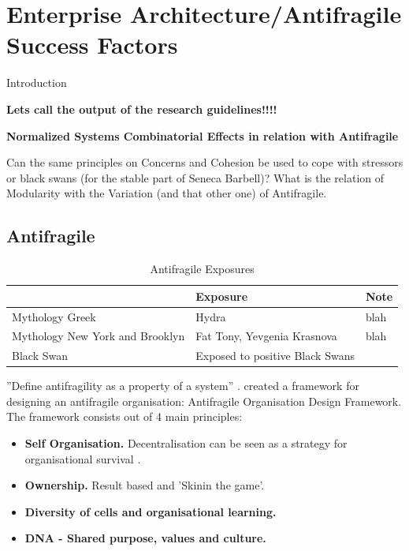 \chapter{Enterprise Architecture/Antifragile Success Factors}
\label{ch:eaafsuccessfactors}

Introduction

\begin{remark}
\textbf{Lets call the output of the research guidelines!!!!}
\end{remark}

\begin{remark}
\textbf{Normalized Systems Combinatorial Effects in relation with Antifragile}

Can the same principles on Concerns and Cohesion be used to cope with stressors or black swans (for the stable part of Seneca Barbell)? What is the relation of Modularity with the Variation (and that other one) of Antifragile.
\end{remark}



\section{Antifragile}
\label{sec:sfantifragile}

\parencite[p. 23-27]{Taleb2012}
\begin{longtable}{p{}p{}p{}}
	& \textbf{Exposure} & \textbf{Note} \\ \midrule%
	\endhead%
	\hline
	\caption{Antifragile Exposures}
	\label{tab:sfantifragile types of exposure}	
	\endfoot%
	Mythology Greek & Hydra & blah \\
	Mythology New York and Brooklyn & Fat Tony, Yevgenia Krasnova & blah \\
	Black Swan & Exposed to positive Black Swans & \\
	
	\bottomrule
\end{longtable}

''Define antifragility as a property of a system'' \parencite{Jaaron2014}. \textcite{Kastner2017} created a framework for designing an antifragile organisation: Antifragile Organisation Design Framework. The framework consists out of 4 main principles:
\begin{itemize}
	\item{\textbf{Self Organisation.} Decentralisation can be seen as a strategy for organisational survival \parencite{Brafman2007}.}
	\item{\textbf{Ownership.} Result based and 'Skinin the game'.}
	\item{\textbf{Diversity of cells and organisational learning.}}
	\item{\textbf{DNA - Shared purpose, values and culture.}}
\end{itemize}

